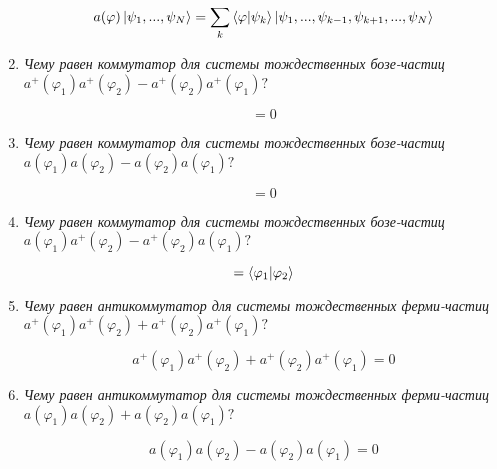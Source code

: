 \documentclass{article}
\begin{document}
\begin{enumerate}
	\begin{equation}
		a(\varphi)\ket{\psi_1, . . . , \psi_N} = \sum\limits_{k} \braket{\varphi|\psi_k} \ket{\psi_1,...,\psi_{k-1},\psi_{k+1},...,\psi_N}
	\end{equation}
	
	\item \textit{Чему равен коммутатор для системы тождественных бозе-частиц \\$a^+(\varphi_1)a^+(\varphi_2) - a^+(\varphi_2)a^+(\varphi_1)?$}
	
	\begin{equation}
		[a^+(\varphi_1), a^+(\varphi_2)] = 0
	\end{equation}
	
	\item \textit{Чему равен коммутатор для системы тождественных бозе-частиц \\$a(\varphi_1)a(\varphi_2) - a(\varphi_2)a(\varphi_1)?$}
	
	\begin{equation}
		[a(\varphi_1), a(\varphi_2)] = 0
	\end{equation}		
	
	\item \textit{Чему равен коммутатор для системы тождественных бозе-частиц \\$a(\varphi_1)a^+(\varphi_2) - a^+(\varphi_2)a(\varphi_1)?$}
	
	\begin{equation}
		[a(\varphi_1), a^+(\varphi_2)] = \braket{\varphi_1|\varphi_2}
	\end{equation}
	
	\item \textit{Чему равен антикоммутатор для системы тождественных ферми-частиц \\$a^+(\varphi_1)a^+(\varphi_2) + a^+(\varphi_2)a^+(\varphi_1)?$}
	
	\begin{equation}
		a^+(\varphi_1)a^+(\varphi_2) + a^+(\varphi_2)a^+(\varphi_1) = 0
	\end{equation}
	
	\item \textit{Чему равен антикоммутатор для системы тождественных ферми-частиц \\$a(\varphi_1)a(\varphi_2) + a(\varphi_2)a(\varphi_1)?$}
	
	\begin{equation}
		a(\varphi_1)a(\varphi_2) - a(\varphi_2)a(\varphi_1) = 0
	\end{equation}
	

\end{enumerate}
\end{document}
